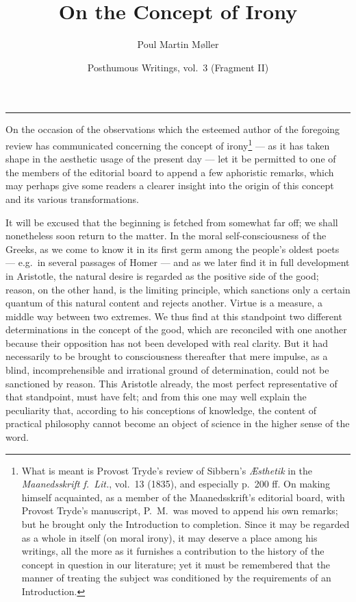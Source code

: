 \documentclass[12pt]{article}
\title{\textbf{On the Concept of Irony}}
\author{Poul Martin Møller}
\date{Posthumous Writings, vol.\ 3 (Fragment II)}
\newcommand{\opage}[1]{\marginnote{\footnotesize\textit{[#1]}}}
\begin{document}
\maketitle

\begin{center}\rule{0.32\textwidth}{0.4pt}\end{center}
\medskip

\opage{152}On the occasion of the observations which the esteemed author of the foregoing review has communicated concerning the concept of irony\footnote{What is meant is Provost Tryde's review of Sibbern's \emph{Æsthetik} in the \emph{Maanedsskrift f.\ Lit.}, vol.\ 13 (1835), and especially p.\ 200 ff. On making himself acquainted, as a member of the Maanedsskrift's editorial board, with Provost Tryde's manuscript, P.\ M.\ was moved to append his own remarks; but he brought only the Introduction to completion. Since it may be regarded as a whole in itself (on moral irony), it may deserve a place among his writings, all the more as it furnishes a contribution to the history of the concept in question in our literature; yet it must be remembered that the manner of treating the subject was conditioned by the requirements of an Introduction.} --- as it has taken shape in the aesthetic usage of the present day --- let it be permitted to one of the members of the editorial board to append a few aphoristic remarks, which may perhaps give some readers a clearer insight into the origin of this concept and its various transformations.

It will be excused that the beginning is fetched from somewhat far off; we shall nonetheless soon return to the matter. In the moral self-consciousness of the Greeks, as we come to know it in its first germ among the people's oldest poets --- e.g.\ in several passages of Homer --- and as we later find it in full development in Aristotle, the natural desire is regarded as the positive side of the good; reason, on the other hand, is the limiting principle, which sanctions only a certain quantum of this \opage{153}natural content and rejects another. Virtue is a measure, a middle way between two extremes. We thus find at this standpoint two different determinations in the concept of the good, which are reconciled with one another because their opposition has not been developed with real clarity. But it had necessarily to be brought to consciousness thereafter that mere impulse, as a blind, incomprehensible and irrational ground of determination, could not be sanctioned by reason. This Aristotle already, the most perfect representative of that standpoint, must have felt; and from this one may well explain the peculiarity that, according to his conceptions of knowledge, the content of practical philosophy cannot become an object of science in the higher sense of the word.
\end{document}

